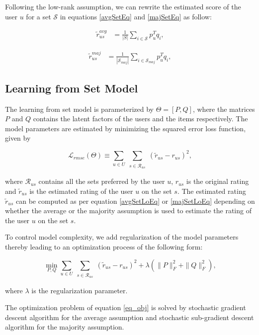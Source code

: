 Following the low-rank assumption, we can rewrite the estimated score of the 
user $u$ for a set $\mathcal{S}$ in equations \ref{avgSetEq} and \ref{majSetEq} as follow:

\begin{equation} \label{avgSetLoEq}
  \begin{split}
    \tilde{r}^{avg}_{us} &= \frac{1}{|S|} \sum_{i \in \mathcal{S}} p_u^Tq_i,
  \end{split}
\end{equation}


\begin{equation} \label{majSetLoEq}
  \begin{split}
    \tilde{r}^{maj}_{us} &= \frac{1}{|\mathcal{S}_{maj}|} \sum_{i \in
    \mathcal{S}_{maj}} p_u^Tq_i,
  \end{split}
\end{equation}


\subsection{Learning from Set Model}
The learning from set model is parameterized by $\Theta=[P, Q]$, where the
matrices $P$ and $Q$ contains the latent factors of the users and the items
respectively. The model parameters are estimated by minimizing the squared error
loss function, given by

%
\begin{equation} \label{eq_rmse}
  \mathcal{L}_{rmse}(\Theta) \equiv \sum_{u \in U} \sum_{\substack{s \in
  \mathcal{R}_{us}}} (\tilde{r}_{us} - r_{us})^2,
\end{equation}
%


where $\mathcal{R}_{us}$ contains all the sets preferred by the user $u$,
$r_{us}$ is the original rating and $\tilde{r}_{us}$ is the estimated rating of
the user $u$ on the set $s$. The estimated rating $\tilde{r}_{us}$ can be
computed as per equation \ref{avgSetLoEq} or \ref{majSetLoEq} depending on
whether the average or the majority assumption is used to estimate the rating of 
the user $u$ on the set $s$. 

To control model complexity, we add regularization of the model parameters
thereby leading to an optimization process of the following form:

%
\begin{equation} \label{eq_obj}
  \min_{P, Q} \sum_{u \in U} \sum_{\substack{s \in \mathcal{R}_{us}}} (\tilde{r}_{us} - r_{us})^2  + \lambda (\|P\|_F^2 + \|Q\|_F^2),
\end{equation}
%

where $\lambda$ is the regularization parameter.


The optimization problem of equation \ref{eq_obj} is solved by stochastic
gradient descent algorithm for the average assumption and stochastic
sub-gradient descent algorithm for the majority assumption.




